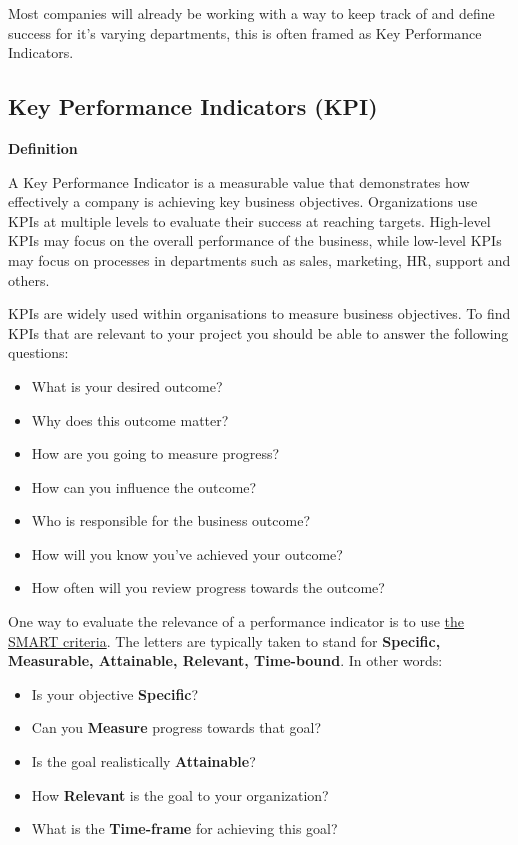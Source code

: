 \documentclass[
]{book}
\providecommand{\tightlist}{%
  \setlength{\itemsep}{0pt}\setlength{\parskip}{0pt}}
\begin{document}
Most companies will already be working with a way to keep track of and
define success for it's varying departments, this is often framed as Key
Performance Indicators.

\hypertarget{KPIs}{%
\subsection{Key Performance Indicators (KPI)}\label{KPIs}}

\begin{infobox}

\textbf{Definition}

A Key Performance Indicator is a measurable value that demonstrates how
effectively a company is achieving key business objectives.
Organizations use KPIs at multiple levels to evaluate their success at
reaching targets. High-level KPIs may focus on the overall performance
of the business, while low-level KPIs may focus on processes in
departments such as sales, marketing, HR, support and others.

\end{infobox}

KPIs are widely used within organisations to measure business
objectives. To find KPIs that are relevant to your project you should be
able to answer the following questions:

\begin{itemize}
\tightlist
\item
  What is your desired outcome?
\item
  Why does this outcome matter?
\item
  How are you going to measure progress?
\item
  How can you influence the outcome?
\item
  Who is responsible for the business outcome?
\item
  How will you know you've achieved your outcome?
\item
  How often will you review progress towards the outcome?
\end{itemize}

One way to evaluate the relevance of a performance indicator is to use
\href{http://en.wikipedia.org/wiki/SMART_criteria}{the SMART criteria}.
The letters are typically taken to stand for \textbf{Specific,
Measurable, Attainable, Relevant, Time-bound}. In other words:

\begin{itemize}
\tightlist
\item
  Is your objective \textbf{Specific}?
\item
  Can you \textbf{Measure} progress towards that goal?
\item
  Is the goal realistically \textbf{Attainable}?
\item
  How \textbf{Relevant} is the goal to your organization?
\item
  What is the \textbf{Time-frame} for achieving this goal?
\end{itemize}
\end{document}
